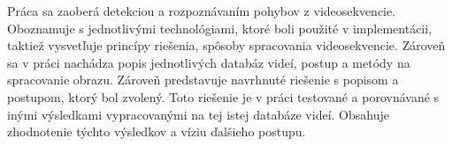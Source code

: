 Práca sa zaoberá detekciou a rozpoznávaním pohybov z videosekvencie. Oboznamuje s jednotlivými technológiami, ktoré boli použité v implementácii, taktiež vysvetľuje princípy riešenia, spôsoby spracovania videosekvencie. Zároveň sa v práci nachádza popis jednotlivých databáz videí, postup a metódy na spracovanie obrazu. Zároveň predstavuje navrhnuté riešenie s popisom a postupom, ktorý bol zvolený. Toto riešenie je v práci testované a porovnávané s inými výsledkami vypracovanými na tej istej databáze videí. Obsahuje zhodnotenie týchto výsledkov a víziu ďalšieho postupu.